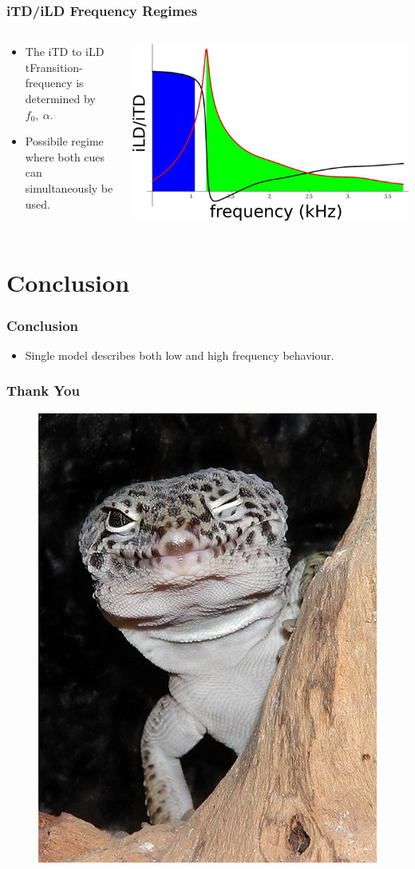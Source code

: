 \documentclass{beamer}
\begin{document}
\begin{frame}
\frametitle{iTD/iLD Frequency Regimes}
\begin{columns}
\begin{column}{0.5\textwidth}
\begin{exampleblock}{}
\small
 \begin{itemize}
  \item The iTD to iLD tFransition-frequency is determined by $f_0,\ \alpha$.
  \item Possibile regime where both cues can simultaneously be used.
 \end{itemize}
\end{exampleblock}
\end{column}
     \begin{column}{0.5\textwidth}
      \includegraphics[width = 6 cm]{Diagrams/Presentation/tokayregions.png}
\end{column}
\end{columns}
\end{frame}

\section{Conclusion}
\begin{frame}[t]
 \frametitle{Conclusion}
 \begin{exampleblock}{}
 \begin{itemize}
  \item Single model describes both low and high frequency behaviour.
 \end{itemize}
\end{exampleblock}
\end{frame}

\begin{frame}[t]
 \frametitle{Thank You}
 \begin{figure}
  \centering
  \includegraphics[width=.3\textwidth]{Diagrams/geckowink.jpg}
 \end{figure}
\end{frame}
\end{document}
